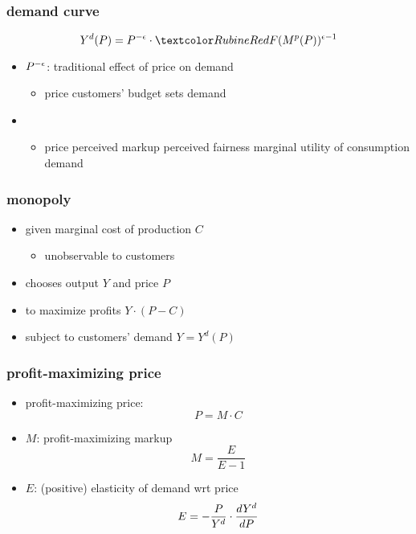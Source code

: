 \documentclass[12pt,xcolor={dvipsnames},hyperref={pdftex,pdfpagemode=UseNone,hidelinks,pdfdisplaydoctitle=true},usepdftitle=false]{beamer}
\begin{document}
\begin{frame}
\frametitle{demand curve}
\begin{equation*}
Y^{d}(P)= P^{-\e}  \cdot  \al{F(M^p(P))^{\e-1}}
\end{equation*}
\begin{itemize}
\item $P^{-\epsilon}$: traditional effect of price on demand
\begin{itemize}
 \item price \then customers' budget sets \then demand
 \end{itemize}
\item {}
\begin{itemize}
\item price \then perceived markup \then perceived fairness \then marginal utility of consumption \then demand
\end{itemize}
\end{itemize}
\end{frame}

\begin{frame}
\frametitle{monopoly}
\begin{itemize}
\item given marginal cost of production $C$
\begin{itemize}
	\item unobservable to customers
\end{itemize}
\item chooses output $Y$ and price $P$
\item to maximize profits $Y \cdot (P-C)$
\item subject to customers' demand $Y = Y^d(P)$
\end{itemize}
\end{frame}


\begin{frame}
\frametitle{profit-maximizing price}
\begin{itemize}    
\item profit-maximizing price: 
\begin{equation*}
P = M \cdot C
\end{equation*}
\item $M$: profit-maximizing markup
\begin{equation*}
M=\frac{E}{E-1}
\end{equation*}
\item $E$: (positive) elasticity of demand wrt price
\begin{equation*}
E = - \frac{P}{Y^d} \cdot \frac{d Y^{d}}{d P} 
\end{equation*}
\end{itemize}
\end{frame}
\end{document}
